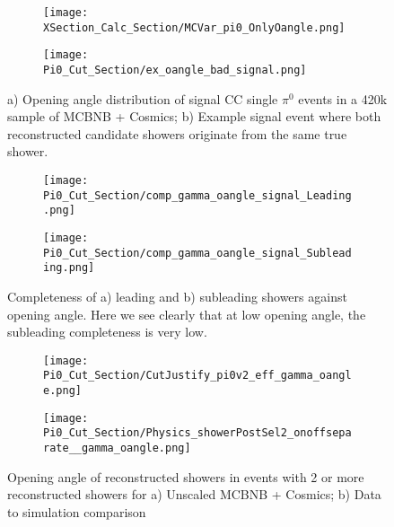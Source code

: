 \begin{figure}[H]
\centering
  \begin{subfigure}[t]{0.35\textwidth}
    \centering
     \texttt{[image: XSection\_Calc\_Section/MCVar\_pi0\_OnlyOangle.png]}
     \caption{ }
  \end{subfigure} 
  \begin{subfigure}[t]{0.6\textwidth}
    \centering
    \texttt{[image: Pi0\_Cut\_Section/ex\_oangle\_bad\_signal.png]}
    \caption{ }
  \end{subfigure} 
  \caption{ a) Opening angle distribution of signal CC single $\pi^0$ events in a 420k sample of MCBNB + Cosmics; b) Example signal event where both reconstructed candidate showers originate from the same true shower. }
\label{fig:mcvar_pi0_onlyoangle}
\end{figure}

\begin{figure}[H]
\centering
  \begin{subfigure}[t]{0.35\textwidth}
    \centering
\texttt{[image: Pi0\_Cut\_Section/comp\_gamma\_oangle\_signal\_Leading.png]}
  \caption{ }
  \end{subfigure} 
  \hspace{20mm}
  \begin{subfigure}[t]{0.35\textwidth}
    \centering
    \texttt{[image: Pi0\_Cut\_Section/comp\_gamma\_oangle\_signal\_Subleading.png]}
  \caption{ }
  \end{subfigure} 
\caption{ Completeness of a) leading and b) subleading showers against opening angle. Here we see clearly that at low opening angle, the subleading completeness is very low. }
\label{fig:comp_cutjust_pi0_OA}
\end{figure}

\begin{figure}[H]
\centering
  \begin{subfigure}[t]{0.35\textwidth}
    \centering
\texttt{[image: Pi0\_Cut\_Section/CutJustify\_pi0v2\_eff\_gamma\_oangle.png]}
  \caption{ }
  \end{subfigure} 
  \hspace{20mm}
  \begin{subfigure}[t]{0.35\textwidth}
    \centering
    \texttt{[image: Pi0\_Cut\_Section/Physics\_showerPostSel2\_onoffseparate\_\_gamma\_oangle.png]}
  \caption{ }
  \end{subfigure} 
\caption{ Opening angle of reconstructed showers in events with 2 or more reconstructed showers for a) Unscaled MCBNB + Cosmics; b) Data to simulation comparison }
\label{fig:cutjust_pi0_OA}
\end{figure}

